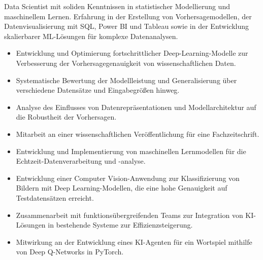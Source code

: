 \documentclass[9pt,a4paper,ragged2e,withhyper]{altacv}
\begin{document}
\begin{paracol}{2}
        Data Scientist mit soliden Kenntnissen in statistischer Modellierung und maschinellem Lernen. Erfahrung in der Erstellung von Vorhersagemodellen, der Datenvisualisierung mit SQL, Power BI und Tableau sowie in der Entwicklung skalierbarer ML-Lösungen für komplexe Datenanalysen.
        
            \begin{itemize}
                \item Entwicklung und Optimierung fortschrittlicher Deep-Learning-Modelle zur Verbesserung der Vorhersagegenauigkeit von wissenschaftlichen Daten.
                \item Systematische Bewertung der Modellleistung und Generalisierung über verschiedene Datensätze und Eingabegrößen hinweg.
                \item Analyse des Einflusses von Datenrepräsentationen und Modellarchitektur auf die Robustheit der Vorhersagen.
                \item Mitarbeit an einer wissenschaftlichen Veröffentlichung für eine Fachzeitschrift.
            \end{itemize}
            \vspace{0.5em}
            \begin{itemize}
                \item Entwicklung und Implementierung von maschinellen Lernmodellen für die Echtzeit-Datenverarbeitung und -analyse.
                \item Entwicklung einer Computer Vision-Anwendung zur Klassifizierung von Bildern mit Deep Learning-Modellen, die eine hohe Genauigkeit auf Testdatensätzen erreicht.
                \item Zusammenarbeit mit funktionsübergreifenden Teams zur Integration von KI-Lösungen in bestehende Systeme zur Effizienzsteigerung.
                \item Mitwirkung an der Entwicklung eines KI-Agenten für ein Wortspiel mithilfe von Deep Q-Networks in PyTorch.
            \end{itemize}
            \vspace{0.5em}
        

\end{paracol}
\end{document}
